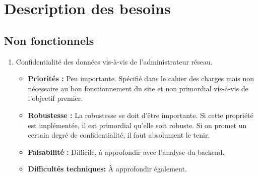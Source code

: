 \documentclass{article}
\begin{document}
\section{Description des besoins}
\subsection{Non fonctionnels}
\begin{enumerate}[noitemsep]
\item Confidentialité des données vis-à-vis de l'administrateur réseau.
\begin{itemize}[noitemsep]
\item \textbf{Priorités : }Peu importante. Spécifié dans le cahier des charges mais non nécessaire au bon fonctionnement du site et non primordial vis-à-vis de l'objectif premier.
\item \textbf{Robustesse : } La robustesse se doit d'être importante. Si cette propriété est implémentée, il est primordial qu'elle soit robuste. Si on promet un certain degré de confidentialité, il faut absolument le tenir.
\item \textbf{Faisabilité : } Difficile, à approfondir avec l'analyse du backend.
\item \textbf{Difficultés techniques: } À approfondir également.
\end{itemize}



\end{enumerate}
\end{document}
